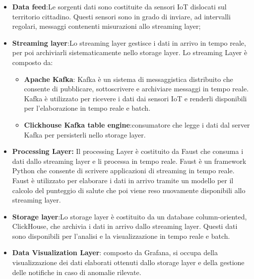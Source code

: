 \begin{itemize}
    \item \textbf{Data feed}:Le sorgenti dati sono costituite da sensori IoT dislocati sul territorio cittadino. Questi sensori sono in grado di inviare, ad intervalli regolari, messaggi contenenti misurazioni allo streaming layer;
    \item \textbf{Streaming layer}:Lo streaming layer gestisce i dati in arrivo in tempo reale, per poi archiviarli sistematicamente nello storage layer. Lo streaming Layer è composto da:
    \begin{itemize}
        \item \textbf{Apache Kafka}: Kafka è un sistema di messaggistica distribuito che consente di pubblicare, sottoscrivere e archiviare messaggi in tempo reale. Kafka è utilizzato per ricevere i dati dai sensori IoT e renderli disponibili per l'elaborazione in tempo reale e batch.
        \item \textbf{Clickhouse Kafka table engine}:consumatore che legge i
        dati dal server Kafka per persisterli nello storage layer.
    \end{itemize}
    \item \textbf{Processing Layer:} Il processing Layer è costituito da Faust che consuma i dati dallo streaming layer e li processa in tempo reale. Faust è un framework Python che consente di scrivere applicazioni di streaming in tempo reale. Faust è utilizzato per elaborare i dati in arrivo tramite un modello per il calcolo del punteggio di salute che poi viene reso nuovamente disponibili allo streaming layer.
    \item \textbf{Storage layer}:Lo storage layer è costituito da un database column-oriented, ClickHouse, che archivia i dati in arrivo dallo streaming layer. Questi dati sono disponibili per l'analisi e la visualizzazione in tempo reale e batch.
    \item \textbf{Data Visualization Layer}: composto da Grafana, si occupa della visualizzazione dei dati elaborati ottenuti dallo storage layer e della gestione delle notifiche in caso di anomalie rilevate.
\end{itemize}






